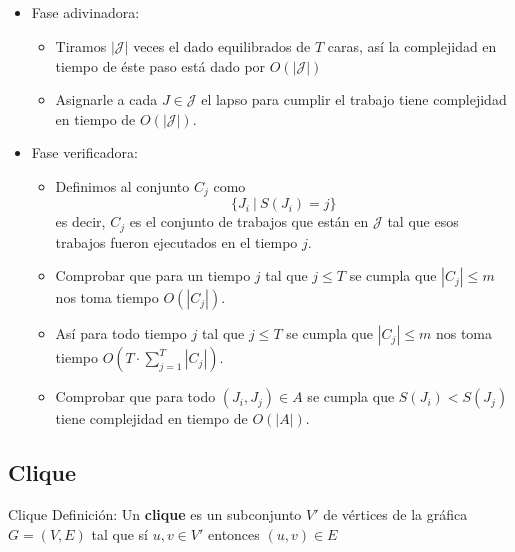 \documentclass[spanish, xcolor=dvipsnames, aspectratio=169]{beamer}
\newcommand{\subsectiontitle}{}
\begin{document}
\subsection{\subsectiontitle}
\begin{frame}{\subsectiontitle}
    \begin{itemize}
        \item Fase adivinadora:
        \begin{itemize}
            \item Tiramos $|\mathcal{J}|$ veces el dado equilibrados de $T$ caras, así la complejidad en tiempo de éste paso está dado por $O\left(|\mathcal{J}|\right)$
            \item Asignarle a cada $J \in \mathcal{J}$ el lapso para cumplir el trabajo tiene complejidad en tiempo de $O\left(|\mathcal{J}|\right)$.
        \end{itemize}
        \item Fase verificadora:
        \begin{itemize}
            \item Definimos al conjunto $C_{j}$ como
            \[
                \{ J_{i} \ | \ S(J_{i}) = j \}
            \]
            es decir, $C_{j}$ es el conjunto de trabajos que están en 
            $\mathcal{J}$ tal que esos trabajos fueron ejecutados en el tiempo $j$.
            \item Comprobar que para un tiempo $j$ tal que $j \leq T$ se cumpla que $|C_{j}| \leq m$ nos toma tiempo $O\left(|C_{j}|\right)$.
            \item Así para todo tiempo $j$ tal que $j \leq T$ se cumpla que $|C_{j}| \leq m$ nos toma tiempo $O\left(T \cdot \sum_{j = 1}^{T} |C_{j}|\right)$.
            \item Comprobar que para todo $(J_{i}, J_{j}) \in A$ se cumpla que
            $S\left(J_{i}\right) < S\left(J_{j}\right)$ tiene complejidad en tiempo de $O\left(|A|\right)$.
        \end{itemize}
    \end{itemize}
\end{frame}
\renewcommand{\subsectiontitle}{Clique}
\subsection{\subsectiontitle}
\begin{frame}{\subsectiontitle}
Definición:
\newline 
Un \textbf{clique} es un subconjunto \(V'\) de vértices de la gráfica \(G = \left(V, E\right)\) tal que sí \( u, v \in V' \) entonces 
\(\left(u, v\right) \in E\)
\end{frame}
\renewcommand{\subsectiontitle}{Ejemplo}
\end{document}
